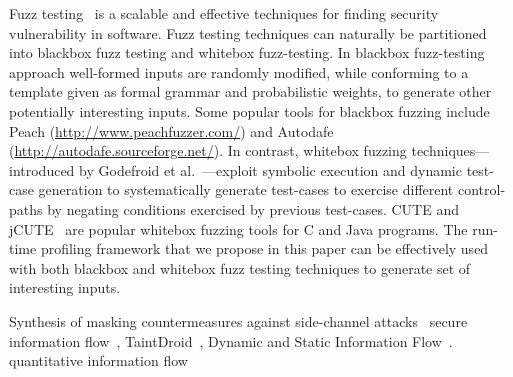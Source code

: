 Fuzz testing~\cite{God12} is a scalable and effective techniques for finding security
vulnerability in software.
Fuzz testing techniques can naturally be partitioned into blackbox fuzz testing 
and whitebox fuzz-testing. 
In blackbox fuzz-testing approach well-formed inputs are randomly modified,
while conforming to a template given as formal grammar and probabilistic
weights, to generate other potentially interesting inputs.  
Some popular tools for blackbox fuzzing include Peach 
(\url{http://www.peachfuzzer.com/}) and Autodafe
(\url{http://autodafe.sourceforge.net/}).
In contrast, whitebox fuzzing techniques---introduced by Godefroid et
al.~\cite{God12,GKS05}---exploit symbolic execution and dynamic test-case generation
to systematically generate test-cases to exercise different control-paths by
negating conditions exercised by previous test-cases.
CUTE and jCUTE~\cite{Sen2006} are popular whitebox fuzzing tools for C and Java
programs. 
The run-time profiling framework that we propose in this paper can be
effectively used with both blackbox and whitebox fuzz testing techniques to
generate set of interesting inputs.



Synthesis of masking countermeasures against side-channel attacks~\cite{EW14}
secure information flow~\cite{Den76}, TaintDroid~\cite{Enck14}, Dynamic and
Static Information Flow~\cite{SR10}.
quantitative information flow~\cite{smith09}





